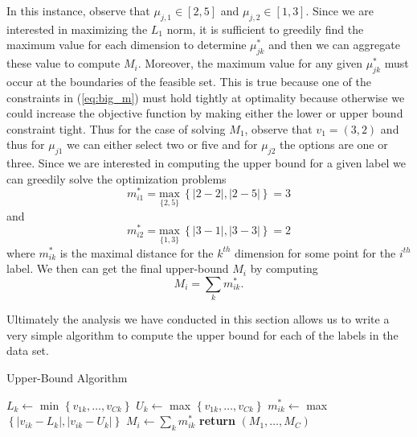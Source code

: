 \documentclass[../thesis.tex]{subfiles}
\begin{document}
In this instance, observe that $\mu_{j, 1} \in [2, 5]$ and $\mu_{j, 2} \in [1,
3]$. Since we are interested in maximizing the $L_1$ norm, it is sufficient to
greedily find the maximum value for each dimension to determine $\mu_{jk}^*$ and
then we can aggregate these value to compute $M_i$. Moreover, the maximum value
for any given $\mu_{jk}^*$ must occur at the boundaries of the feasible set.
This is true because one of the constraints in (\ref{eq:big_m}) must hold
tightly at optimality because otherwise we could increase the objective function
by making either the lower or upper bound constraint tight. Thus for the case of
solving $M_1$, observe that $v_1 = (3, 2)$ and thus for $\mu_{j1}$ we can either
select two or five and for $\mu_{j2}$ the options are one or three. Since we are
interested in computing the upper bound for a given label we can greedily solve
the optimization problems
\begin{equation*}
    m_{i1}^* = \underset{\{2, 5\}}{\text{max}} \ \left\{|2-2|, |2-5|\right\} = 3
\end{equation*}
and
\begin{equation*}
    m_{i2}^* = \underset{\{1, 3\}}{\text{max}} \ \left\{|3-1|, |3-3|\right\} = 2
\end{equation*}
where $m_{ik}^*$ is the maximal distance for the $k^{th}$ dimension for some
point for the $i^{th}$ label. We then can get the final upper-bound $M_i$ by
computing
\begin{equation}
    M_i = \sum_k m_{ik}^*.
\end{equation}

Ultimately the analysis we have conducted in this section allows us to write a
very simple algorithm to compute the upper bound for each of the labels in the
data set.
\begin{algorithm}
    \caption{Upper-Bound Algorithm}
    \label{alg:upperbound}
    \begin{algorithmic}[1]
             
                \State $L_k \gets$ min $\left\{v_{1k}, \ldots, v_{Ck}\right\}$
                \State $U_k \gets$ max $\left\{v_{1k}, \ldots, v_{Ck}\right\}$
            \EndFor
             
                    \State $m_{ik}^* \gets$ max $\left\{|v_{ik} - L_k|, |v_{ik}
                    - U_k|\right\}$
                \EndFor
                \State $M_i \gets \sum_k m_{ik}^*$
            \EndFor
            \State \textbf{return} $(M_1, \ldots, M_C)$
        \EndProcedure
    \end{algorithmic}
\end{algorithm}
\end{document}
